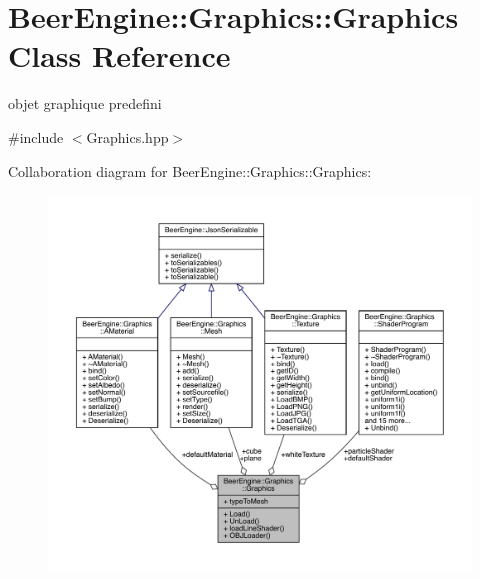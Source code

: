 \hypertarget{class_beer_engine_1_1_graphics_1_1_graphics}{}\section{Beer\+Engine\+:\+:Graphics\+:\+:Graphics Class Reference}
\label{class_beer_engine_1_1_graphics_1_1_graphics}


objet graphique predefini  




{\ttfamily \#include $<$Graphics.\+hpp$>$}



Collaboration diagram for Beer\+Engine\+:\+:Graphics\+:\+:Graphics\+:
\nopagebreak
\begin{figure}[H]
\begin{center}
\leavevmode
\includegraphics[width=350pt]{class_beer_engine_1_1_graphics_1_1_graphics__coll__graph}
\end{center}
\end{figure}
